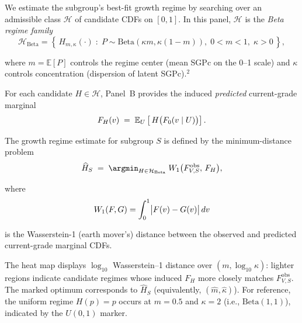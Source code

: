 \documentclass[10pt]{article}
\begin{document}
\noindent
\begin{minipage}[t]{3.75in}
  \vspace{0.05in}
  \hspace{0.15in}%
  \begin{minipage}{3.45in}
    \small\raggedright\color{bodyGrey}

    We estimate the subgroup's best-fit growth regime by searching 
    over an admissible class $\mathcal{H}$ of candidate CDFs on $[0,1]$.
    In this panel, $\mathcal{H}$ is the \emph{Beta regime family}
    \[
      \mathcal{H}_{\mathrm{Beta}}
      =\left\{\,H_{m,\kappa}(\cdot)\;:\;P\sim\mathrm{Beta}(\kappa m,\kappa(1-m)),\;0<m<1,\;\kappa>0\,\right\},
    \]
    
    \vspace{1pt}
    where $m=\mathbb{E}[P]$ controls the regime center (mean SGPc on the 0--1 scale) and
    $\kappa$ controls concentration (dispersion of latent SGPc).$^\mbox{2}$
    
    \vspace{4pt}
    For each candidate $H\in\mathcal{H}$, Panel~B provides the 
    induced \emph{predicted} current-grade marginal
    \[
      F_{H}(v)\;=\;\mathbb{E}_{U}\left[\,H\bigl(F_0(v\mid U)\bigr)\right].
    \]

    \vspace{1pt}
    The growth regime estimate for subgroup $S$ is defined by the minimum-distance problem
    \[
      \widehat{H}_S \;=\;
      \argmin_{H\in\mathcal{H}_{\mathrm{Beta}}}\;
      \Wone\bigl(F^{\mathrm{obs}}_{V,S},\,F_{H}\bigr),
    \]

    \vspace{1pt}
    where
    \[
      W_1(F,G)=\int_0^1 \bigl|F(v)-G(v)\bigr|\,dv
    \]

    \vspace{1pt}
    is the Wasserstein-1 (earth mover's) distance between the observed and predicted current-grade marginal CDFs. 
    
    \vspace{4pt}
    The heat map displays $\log_{10}$ Wasserstein--1 distance over $(m,\log_{10}\kappa)$:
    lighter regions indicate candidate regimes whose induced $F_H$ more closely 
    matches $F^{\mathrm{obs}}_{V,S}$. The marked optimum corresponds to $\widehat{H}_S$ 
    (equivalently, $(\hat m,\hat\kappa)$). For reference, the uniform regime $H(p)=p$ 
    occurs at $m=0.5$ and $\kappa=2$ (i.e., $\mathrm{Beta}(1,1)$), indicated by the $U(0,1)$ marker.

  \end{minipage}
  \vspace{0.1in}
\end{minipage}
\end{document}
